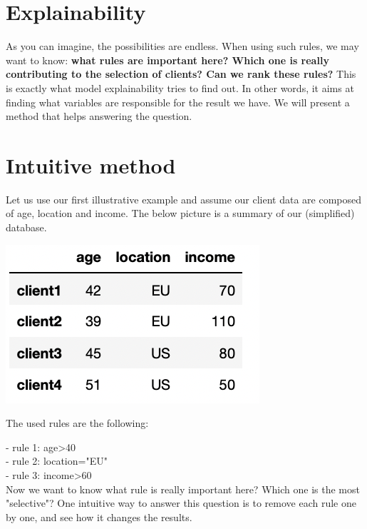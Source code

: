 \section{Explainability}

\label{sec:explainability}

As you can imagine, the possibilities are endless. When using such rules, we may want to know: \textbf{what rules are important here? Which one is really contributing to the selection of clients? Can we rank these rules?} This is exactly what model explainability tries to find out. In other words, it aims at finding what variables are responsible for the result we have. We will present a method that helps answering the question. \\

\section{Intuitive method}

\label{sec:intuitive-method}

Let us use our first illustrative example and assume our client data are composed of age, location and income. The below picture is a summary of our (simplified) database. 

\begin{center}
\includegraphics[scale=0.6]{data-simple-example.png}
\end{center}

The used rules are the following:

- rule 1: age>40 \\
- rule 2: location="EU" \\
- rule 3: income>60 \\

Now we want to know what rule is really important here? Which one is the most "selective"? One intuitive way to answer this question is to remove each rule one by one, and see how it changes the results. \\


